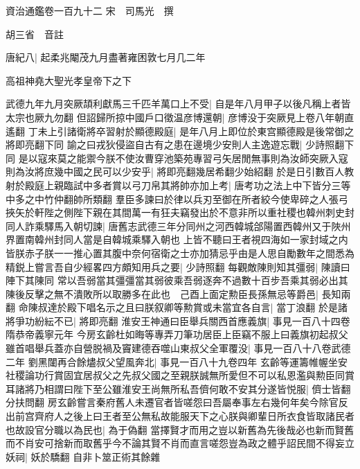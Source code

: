 資治通鑑卷一百九十二
宋　司馬光　撰

胡三省　音註

唐紀八|{
	起柔兆閹茂九月盡著雍困敦七月几二年}


高祖神堯大聖光孝皇帝下之下

武德九年九月突厥頡利獻馬三千匹羊萬口上不受|{
	自是年八月甲子以後凡稱上者皆太宗也厥九勿翻}
但詔歸所掠中國戶口徵温彦博還朝|{
	彦博没于突厥見上卷八年朝直遙翻}
丁未上引諸衛將卒習射於顯德殿庭|{
	是年八月上即位於東宫顯德殿是後常御之將即亮翻下同}
諭之曰戎狄侵盜自古有之患在邊境少安則人主逸遊忘戰|{
	少詩照翻下同}
是以寇來莫之能禦今朕不使汝曹穿池築苑專習弓矢居閒無事則為汝師突厥入寇則為汝將庶幾中國之民可以少安乎|{
	將即亮翻幾居希翻少始紹翻}
於是日引數百人教射於殿庭上親臨試中多者賞以弓刀帛其將帥亦加上考|{
	唐考功之法上中下皆分三等中多之中竹仲翻帥所類翻}
羣臣多諫曰於律以兵刃至御在所者絞今使卑碎之人張弓挾矢於軒陛之側陛下親在其間萬一有狂夫竊發出於不意非所以重社稷也韓州刺史封同人詐乘驛馬入朝切諫|{
	唐舊志武德三年分同州之河西韓城郃陽置西韓州又于陜州界置南韓州封同人當是自韓城乘驛入朝也}
上皆不聽曰王者視四海如一家封域之内皆朕赤子朕一一推心置其腹中奈何宿衛之士亦加猜忌乎由是人思自勵數年之間悉為精鋭上嘗言吾自少經畧四方頗知用兵之要|{
	少詩照翻}
每觀敵陳則知其彊弱|{
	陳讀曰陣下其陳同}
常以吾弱當其彊彊當其弱彼乘吾弱逐奔不過數十百步吾乘其弱必出其陳後反擊之無不潰敗所以取勝多在此也　己酉上面定勲臣長孫無忌等爵邑|{
	長知兩翻}
命陳叔達於殿下唱名示之且曰朕叙卿等勲賞或未當宜各自言|{
	當丁浪翻}
於是諸將爭功紛紜不已|{
	將即亮翻}
淮安王神通曰臣舉兵關西首應義旗|{
	事見一百八十四卷隋恭帝義寧元年}
今房玄齡杜如晦等專弄刀筆功居臣上臣竊不服上曰義旗初起叔父雖首唱舉兵蓋亦自營脱禍及竇建德吞噬山東叔父全軍覆没|{
	事見一百八十八卷武德二年}
劉黑闥再合餘燼叔父望風奔北|{
	事見一百八十九卷四年}
玄齡等運籌帷幄坐安社稷論功行賞固宜居叔父之先叔父國之至親朕誠無所愛但不可以私恩濫與勲臣同賞耳諸將乃相謂曰陛下至公雖淮安王尚無所私吾儕何敢不安其分遂皆悦服|{
	儕士皆翻分扶問翻}
房玄齡嘗言秦府舊人未遷官者皆嗟怨曰吾屬奉事左右幾何年矣今除官反出前宫齊府人之後上曰王者至公無私故能服天下之心朕與卿輩日所衣食皆取諸民者也故設官分職以為民也|{
	為于偽翻}
當擇賢才而用之豈以新舊為先後哉必也新而賢舊而不肖安可捨新而取舊乎今不論其賢不肖而直言嗟怨豈為政之體乎詔民間不得妄立妖祠|{
	妖於驕翻}
自非卜筮正術其餘雜

